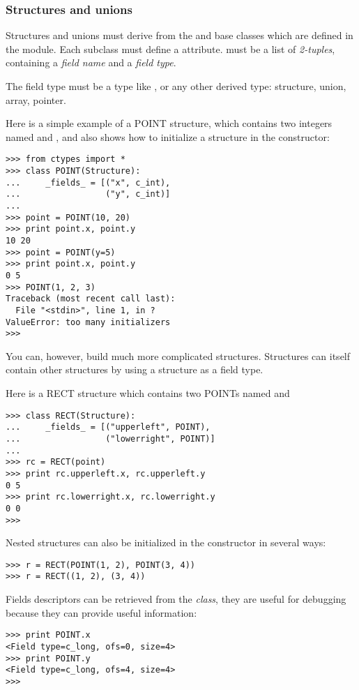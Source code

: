 \subsubsection{Structures and unions\label{ctypes-structures-unions}}

Structures and unions must derive from the  and 
base classes which are defined in the  module. Each subclass
must define a  attribute.   must be a list of
\emph{2-tuples}, containing a \emph{field name} and a \emph{field type}.

The field type must be a  type like , or any other
derived  type: structure, union, array, pointer.

Here is a simple example of a POINT structure, which contains two
integers named  and , and also shows how to initialize a
structure in the constructor:
\begin{verbatim}
>>> from ctypes import *
>>> class POINT(Structure):
...     _fields_ = [("x", c_int),
...                 ("y", c_int)]
...
>>> point = POINT(10, 20)
>>> print point.x, point.y
10 20
>>> point = POINT(y=5)
>>> print point.x, point.y
0 5
>>> POINT(1, 2, 3)
Traceback (most recent call last):
  File "<stdin>", line 1, in ?
ValueError: too many initializers
>>>
\end{verbatim}

You can, however, build much more complicated structures. Structures
can itself contain other structures by using a structure as a field
type.

Here is a RECT structure which contains two POINTs named 
and 
\begin{verbatim}
>>> class RECT(Structure):
...     _fields_ = [("upperleft", POINT),
...                 ("lowerright", POINT)]
...
>>> rc = RECT(point)
>>> print rc.upperleft.x, rc.upperleft.y
0 5
>>> print rc.lowerright.x, rc.lowerright.y
0 0
>>>
\end{verbatim}

Nested structures can also be initialized in the constructor in
several ways:
\begin{verbatim}
>>> r = RECT(POINT(1, 2), POINT(3, 4))
>>> r = RECT((1, 2), (3, 4))
\end{verbatim}

Fields descriptors can be retrieved from the \emph{class}, they are useful
for debugging because they can provide useful information:
\begin{verbatim}
>>> print POINT.x
<Field type=c_long, ofs=0, size=4>
>>> print POINT.y
<Field type=c_long, ofs=4, size=4>
>>>
\end{verbatim}


